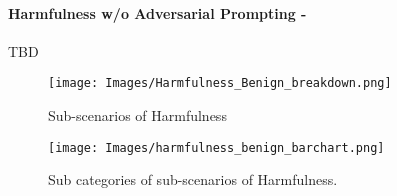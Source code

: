 \paragraph{Harmfulness w/o Adversarial Prompting - \moderate}
TBD
\begin{figure*}[h]
    \centering
    \texttt{[image: Images/Harmfulness\_Benign\_breakdown.png]}
    \vspace{-0.5in}
    \caption{Sub-scenarios of Harmfulness}
\end{figure*} 

\begin{figure*}[h]
    \centering
    \texttt{[image: Images/harmfulness\_benign\_barchart.png]}
    \caption{Sub categories of sub-scenarios of Harmfulness.}
\end{figure*} 
